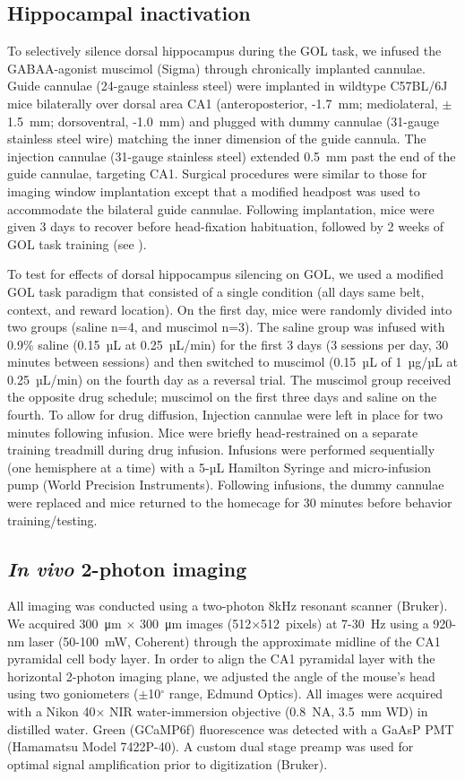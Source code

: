 \subsection{Hippocampal inactivation}
To selectively silence dorsal hippocampus during the GOL task, we infused the GABAA-agonist muscimol (Sigma) through chronically implanted cannulae. Guide cannulae (24-gauge stainless steel) were implanted in wildtype C57BL/6J mice bilaterally over dorsal area CA1 (anteroposterior, -1.7~mm; mediolateral, $\pm$1.5~mm; dorsoventral, -1.0~mm) and plugged with dummy cannulae (31-gauge stainless steel wire) matching the inner dimension of the guide cannula. The injection cannulae (31-gauge stainless steel) extended 0.5~mm past the end of the guide cannulae, targeting CA1. Surgical procedures were similar to those for imaging window implantation except that a modified headpost was used to accommodate the bilateral guide cannulae. Following implantation, mice were given 3 days to recover before head-fixation habituation, followed by 2 weeks of GOL task training (see ).

To test for effects of dorsal hippocampus silencing on GOL, we used a modified GOL task paradigm that consisted of a single condition (all days same belt, context, and reward location). On the first day, mice were randomly divided into two groups (saline n=4, and muscimol n=3). The saline group was infused with 0.9\% saline (0.15~µL at 0.25~µL/min) for the first 3 days (3 sessions per day, 30 minutes between sessions) and then switched to muscimol (0.15~µL of 1~µg/µL at 0.25~µL/min) on the fourth day as a reversal trial. The muscimol group received the opposite drug schedule; muscimol on the first three days and saline on the fourth. To allow for drug diffusion, Injection cannulae were left in place for two minutes following infusion. Mice were briefly head-restrained on a separate training treadmill during drug infusion. Infusions were performed sequentially (one hemisphere at a time) with a 5-µL Hamilton Syringe and micro-infusion pump (World Precision Instruments). Following infusions, the dummy cannulae were replaced and mice returned to the homecage for 30 minutes before behavior training/testing.

\subsection{\emph{In vivo} 2-photon imaging}
All imaging was conducted using a two-photon 8kHz resonant scanner (Bruker). We acquired 300~μm $\times$ 300~μm images (512$\times$512~pixels) at 7-30~Hz using a 920-nm laser (50-100~mW, Coherent) through the approximate midline of the CA1 pyramidal cell body layer.  In order to align the CA1 pyramidal layer with the horizontal 2-photon imaging plane, we adjusted the angle of the mouse's head using two goniometers ($\pm$10$^{\circ}$ range, Edmund Optics).  All images were acquired with a Nikon 40$\times$ NIR water-immersion objective (0.8~NA, 3.5~mm WD) in distilled water. Green (GCaMP6f) fluorescence was detected with a GaAsP PMT (Hamamatsu Model 7422P-40). A custom dual stage preamp was used for optimal signal amplification prior to digitization (Bruker). 

